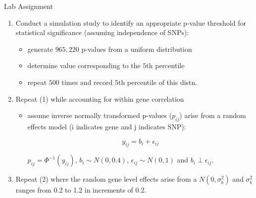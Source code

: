 \documentclass[table]{beamer}\usepackage[]{graphicx}\usepackage[]{color}
\begin{document}
\begin{frame}{Lab Assignment}
\begin{enumerate}
\item Conduct a simulation study to identify an appropriate p-value threshold for statistical significance (assuming independence of SNPs):
\begin{itemize}
	\item generate $965,220$ p-values from a uniform distribution
	\item determine value corresponding to the $5$th percentile
	\item repeat $500$ times and record $5$th percentile of this distn.
	\end{itemize}
\item Repeat (1) while accounting for within gene correlation
	\begin{itemize}
	\item assume inverse normally transformed p-values ($p_{ij}$) arise from a random effects model (i indicates gene and j indicates SNP):
	
	\begin{equation*}
	y_{ij}= b_i +\epsilon_{ij}
	\end{equation*}
	
	$p_{ij}=\Phi^{-1}(y_{ij})$, $b_i \sim N(0,0.4)$, $\epsilon_{ij} \sim N(0,1)$ and $b_i \perp \epsilon_{ij}$.
	 
	\end{itemize}
\item Repeat (2) where the random gene level effects arise from a $N(0,\sigma_b^2)$ and $\sigma_b^2$ ranges from 0.2 to 1.2 in increments of 0.2. 
\end{enumerate} 
\end{frame}
\end{document}
